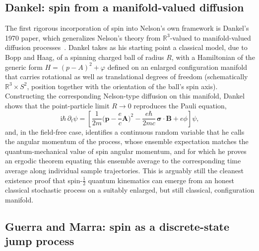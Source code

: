 \documentclass[11pt]{article}
\newcommand{\R}{\mathbb{R}}
\newcommand{\ii}{\mathrm{i}}
\begin{document}
\subsection{Dankel: spin from a manifold-valued diffusion}

The first rigorous incorporation of spin into Nelson's own framework is
Dankel's 1970 paper, which generalizes Nelson's theory from $\R^3$-valued
to manifold-valued diffusion processes~\cite{dankel70}. Dankel takes as his
starting point a classical model, due to Bopp and Haag, of a spinning
charged ball of radius $R$, with a Hamiltonian of the generic form 
$H=(p-A)^2+\varphi$ defined on an enlarged configuration manifold that
carries rotational as well as translational degrees of freedom
(schematically $\R^3\times S^2$, position together with the orientation of
the ball's spin axis). Constructing the corresponding Nelson-type diffusion
on this manifold, Dankel shows that the point-particle limit $R\to 0$
reproduces the Pauli equation,
\begin{equation}
\ii\hbar\,\partial_t\psi = \left[\frac{1}{2m}\Big(\mathbf p-\frac{e}{c}\mathbf A\Big)^2 - \frac{e\hbar}{2mc}\,\boldsymbol\sigma\!\cdot\!\mathbf B + e\phi\right]\psi,
\end{equation}
and, in the field-free case, identifies a continuous random variable that
he calls the angular momentum of the process, whose ensemble expectation
matches the quantum-mechanical value of spin angular momentum, and for
which he proves an ergodic theorem equating this ensemble average to the
corresponding time average along individual sample trajectories. This is
arguably still the cleanest existence proof that spin-$\tfrac12$ quantum
kinematics can emerge from an honest classical stochastic process on a
suitably enlarged, but still classical, configuration manifold.

\subsection{Guerra and Marra: spin as a discrete-state jump process}
\end{document}
